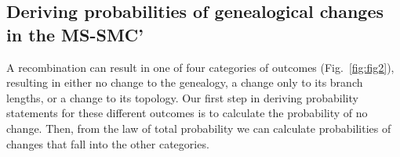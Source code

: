 \documentclass[11pt]{article}
\begin{document}
\subsection{Deriving probabilities of genealogical changes in the MS-SMC'}
A recombination can result in one of four categories of outcomes (Fig.~\ref{fig:fig2}), 
resulting in either no change to the genealogy, a change only to its branch lengths, 
or a change to its topology. Our first step in deriving probability statements for
these different outcomes is to calculate the probability of no change. Then, from
the law of total probability we can calculate probabilities of changes that 
fall into the other categories.
\end{document}
